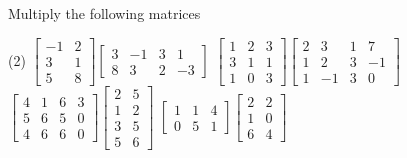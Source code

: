 \begin{exercise}
Multiply the following matrices
\begin{tasks}(2)
\task
$\begin{bmatrix}
-1 & 2 \\
3 & 1 \\
5 & 8
\end{bmatrix}
\begin{bmatrix}
3 & -1 & 3 & 1 \\
8 & 3 & 2 & -3
\end{bmatrix}$
\task
$\begin{bmatrix}
1 & 2 & 3 \\
3 & 1 & 1 \\
1 & 0 & 3
\end{bmatrix}
\begin{bmatrix}
2 & 3 & 1 & 7 \\
1 & 2 & 3 & -1 \\
1 & -1 & 3 & 0
\end{bmatrix}$
\task
$\begin{bmatrix}
4 & 1 & 6 & 3 \\
5 & 6 & 5 & 0 \\
4 & 6 & 6 & 0
\end{bmatrix}
\begin{bmatrix}
2 & 5 \\
1 & 2 \\
3 & 5 \\
5 & 6
\end{bmatrix}$
\task
$\begin{bmatrix}
1 & 1 & 4 \\
0 & 5 & 1
\end{bmatrix}
\begin{bmatrix}
2 & 2 \\
1 & 0 \\
6 & 4
\end{bmatrix}$
\end{tasks}
\end{exercise}

